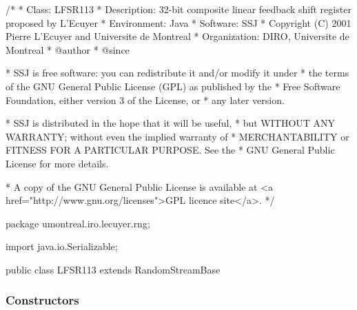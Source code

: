 \begin{code}
\begin{hide}
/*
 * Class:        LFSR113
 * Description:  32-bit composite linear feedback shift register proposed by L'Ecuyer
 * Environment:  Java
 * Software:     SSJ
 * Copyright (C) 2001  Pierre L'Ecuyer and Universite de Montreal
 * Organization: DIRO, Universite de Montreal
 * @author
 * @since

 * SSJ is free software: you can redistribute it and/or modify it under
 * the terms of the GNU General Public License (GPL) as published by the
 * Free Software Foundation, either version 3 of the License, or
 * any later version.

 * SSJ is distributed in the hope that it will be useful,
 * but WITHOUT ANY WARRANTY; without even the implied warranty of
 * MERCHANTABILITY or FITNESS FOR A PARTICULAR PURPOSE.  See the
 * GNU General Public License for more details.

 * A copy of the GNU General Public License is available at
   <a href="http://www.gnu.org/licenses">GPL licence site</a>.
 */
\end{hide}
package umontreal.iro.lecuyer.rng; \begin{hide}

import java.io.Serializable;
\end{hide}

public class LFSR113 extends RandomStreamBase \begin{hide} {

   private static final long serialVersionUID = 70510L;
   // La date de modification a l'envers, lire 10/05/2007

   // generator constant: make sure that double values 0 and 1 never occur
   private static final double NORM = 1.0 / 0x100000001L;   // 2^32 + 1


   // state variables:
   private int z0;
   private int z1;
   private int z2;
   private int z3;

   //stream and substream variables :
   private int[] stream;
   private int[] substream;
   private static int[] curr_stream = {987654321, 987654321, 987654321, 987654321};

 \end{hide}
\end{code}

\subsubsection* {Constructors}

